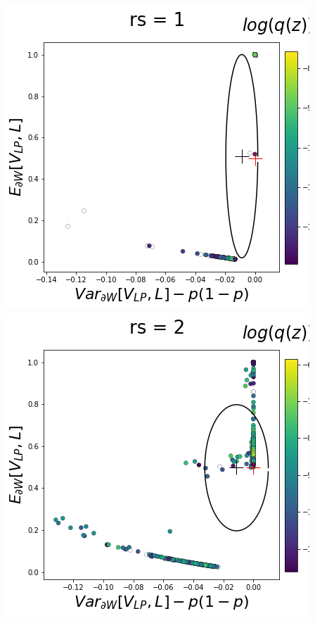 \documentclass[11pt]{article}
\begin{document}
\begin{center}
\includegraphics[scale=0.33]{figs/T_x_SC_reduced_c=0_p=50_rs=1.png}
\includegraphics[scale=0.33]{figs/T_x_SC_reduced_c=0_p=50_rs=2.png}

\end{center}
\end{document}

